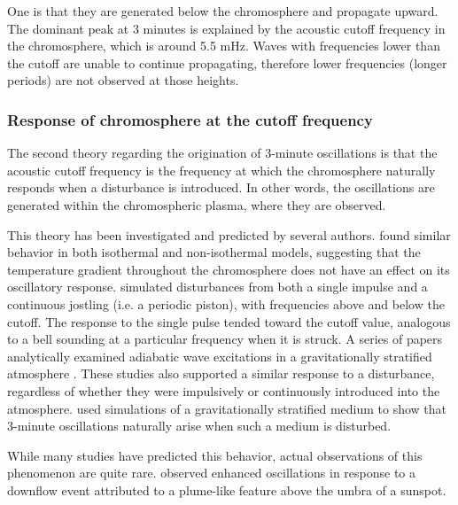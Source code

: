One is that they are generated below the chromosphere and
propagate upward. The dominant peak at 3 minutes is explained by
the acoustic cutoff frequency in the chromosphere, which is around
5.5 mHz.
Waves with frequencies lower than the cutoff are unable to continue
propagating, therefore lower frequencies (longer periods) are not
observed at those heights.


\subsubsection{Response of chromosphere at the cutoff frequency}

The second theory regarding the origination of 3-minute oscillations
is that the acoustic cutoff frequency is the frequency at which the
chromosphere naturally responds when a disturbance is introduced.
In other words, the oscillations are
generated within the chromospheric plasma, where they are observed.

This theory has been investigated and predicted by several authors.
\cite{Fleck1991} found similar behavior in
both isothermal and non-isothermal models, suggesting that the temperature
gradient throughout the chromosphere does not have an effect on its oscillatory
response. \cite{Kalkofen1994} simulated disturbances from both a single impulse
and a continuous jostling (i.e. a periodic piston), with frequencies above and
below the cutoff. The response to the single pulse tended toward the cutoff
value, analogous to a bell sounding at a particular frequency when it is
struck. A series of papers analytically examined adiabatic wave excitations in
a gravitationally stratified atmosphere \citep{Sutmann1995a, Sutmann1995b,
Sutmann1998}. These studies also supported a similar response to a disturbance,
regardless of whether they were impulsively or continuously introduced into the
atmosphere. \cite{Chae2015} used simulations of a gravitationally stratified
medium to show that 3-minute oscillations naturally arise when such a medium is
disturbed.

While many studies have predicted this behavior,
actual observations of this phenomenon are quite rare.
\cite{Kwak2016}
observed enhanced oscillations in response to a downflow
event attributed to a plume-like feature above the umbra of a sunspot.


